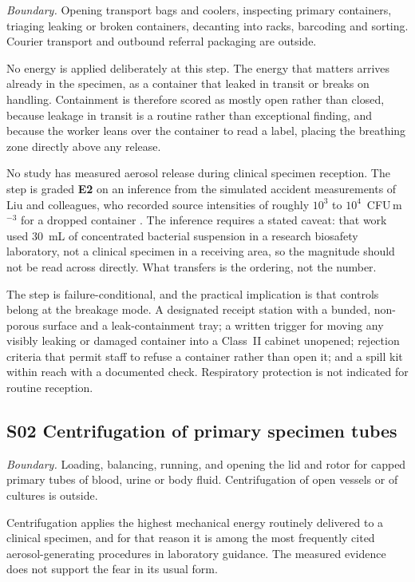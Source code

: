 \textit{Boundary.} Opening transport bags and coolers, inspecting primary
containers, triaging leaking or broken containers, decanting into racks,
barcoding and sorting. Courier transport and outbound referral packaging are
outside.

No energy is applied deliberately at this step. The energy that matters arrives
already in the specimen, as a container that leaked in transit or breaks on
handling. Containment is therefore scored as mostly open rather than closed,
because leakage in transit is a routine rather than exceptional finding, and
because the worker leans over the container to read a label, placing the
breathing zone directly above any release.

No study has measured aerosol release during clinical specimen reception.
The step is graded \textbf{E2} on an inference from the simulated accident
measurements of Liu and colleagues, who recorded source intensities of roughly
$10^{3}$ to $10^{4}$~CFU\,m$^{-3}$ for a dropped container \cite{liu2023}. The
inference requires a stated caveat: that work used 30~mL of concentrated
bacterial suspension in a research biosafety laboratory, not a clinical
specimen in a receiving area, so the magnitude should not be read across
directly. What transfers is the ordering, not the number.

The step is failure-conditional, and the practical implication is that
controls belong at the breakage mode. A designated receipt station with a
bunded, non-porous surface and a leak-containment tray; a written trigger for
moving any visibly leaking or damaged container into a Class~II cabinet
unopened; rejection criteria that permit staff to refuse a container rather
than open it; and a spill kit within reach with a documented check. Respiratory
protection is not indicated for routine reception.

\subsection{S02 Centrifugation of primary specimen tubes}

\textit{Boundary.} Loading, balancing, running, and opening the lid and rotor
for capped primary tubes of blood, urine or body fluid. Centrifugation of open
vessels or of cultures is outside.

Centrifugation applies the highest mechanical energy routinely delivered to a
clinical specimen, and for that reason it is among the most frequently cited
aerosol-generating procedures in laboratory guidance. The measured evidence
does not support the fear in its usual form.

